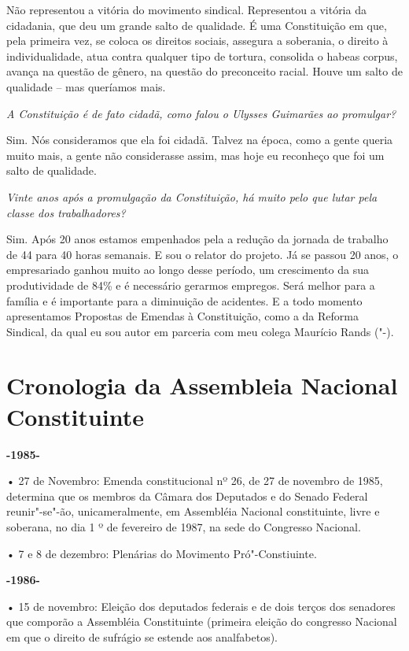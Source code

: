 Não representou a vitória do movimento sindical.
Representou a vitória da cidadania, que deu um grande salto de
qualidade. É uma Constituição em que, pela primeira vez, se coloca os
direitos sociais, assegura a soberania, o direito à individualidade,
atua contra qualquer tipo de tortura, consolida o habeas corpus, avança
na questão de gênero, na questão do preconceito racial. Houve um salto
de qualidade -- mas queríamos mais.

\medskip

\noindent\emph{A Constituição é de fato cidadã, como falou o Ulysses Guimarães
ao promulgar?}

Sim. Nós consideramos que ela foi cidadã. Talvez na
época, como a gente queria muito mais, a gente não considerasse assim,
mas hoje eu reconheço que foi um salto de qualidade.

\medskip

\noindent\emph{Vinte anos após a promulgação da Constituição, há muito pelo que
lutar pela classe dos trabalhadores?}

Sim. Após 20 anos estamos empenhados pela a redução
da jornada de trabalho de 44 para 40 horas semanais. E sou o relator do
projeto. Já se passou 20 anos, o empresariado ganhou muito ao longo
desse período, um crescimento da sua produtividade de 84\% e é
necessário gerarmos empregos. Será melhor para a família e é importante
para a diminuição de acidentes. E a todo momento apresentamos Propostas
de Emendas à Constituição, como a  da Reforma Sindical, da qual eu
sou autor em parceria com meu colega Maurício Rands ("-).

\chapter{Cronologia da Assembleia Nacional Constituinte}

\textbf{-1985-}

• 27 de Novembro: Emenda constitucional nº 26, de 27 de novembro de
1985, determina que os membros da Câmara dos Deputados e do Senado
Federal reunir"-se"-ão, unicameralmente, em Assembléia Nacional
constituinte, livre e soberana, no dia 1 º de fevereiro de 1987, na sede
do Congresso Nacional.

• 7 e 8 de dezembro: Plenárias do Movimento Pró"-Constiuinte.

\textbf{-1986-}

• 15 de novembro: Eleição dos deputados federais e de dois terços dos
senadores que comporão a Assembléia Constituinte (primeira eleição do
congresso Nacional em que o direito de sufrágio se estende aos
analfabetos).

